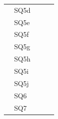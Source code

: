 \documentclass[]{book}
\begin{document}
\begin{table}[ht]
\begin{tabular}{|l|l|l|p{3cm}|p{5cm}|}
        & SQ5d                                  &                                    &                                                         &                                                                                                                 \\ \cline{2-2}
        & SQ5e                                  &                                    &                                                         &                                                                                                                 \\ \cline{2-2}
        & SQ5f                                  &                                    &                                                         &                                                                                                                 \\ \cline{2-2}
        & SQ5g                                  &                                    &                                                         &                                                                                                                 \\ \cline{2-2}
        & SQ5h                                  &                                    &                                                         &                                                                                                                 \\ \cline{2-2}
        & SQ5i                                  &                                    &                                                         &                                                                                                                 \\ \cline{2-2}
        & SQ5j                                  &                                    &                                                         &                                                                                                                 \\ \cline{2-2}
        & SQ6                                   &                                    &                                                         &                                                                                                                 \\ \cline{2-2}
        & SQ7                                   &                                    &                                                         &                                                                                                                 \\ \cline{2-2}

\end{tabular}
\end{table}
\end{document}
